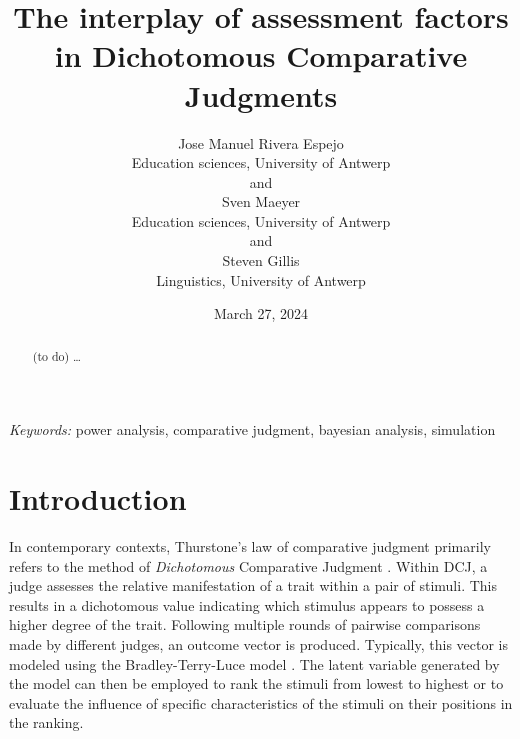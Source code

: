 \documentclass[
  12pt]{article}
\begin{document}
\def\spacingset#1{\renewcommand{\baselinestretch}%
{#1}\small\normalsize} \spacingset{1}



\date{March 27, 2024}
\title{\bf The interplay of assessment factors in Dichotomous
Comparative Judgments}
\author{
Jose Manuel Rivera Espejo\\
Education sciences, University of Antwerp\\
and\\Sven Maeyer\\
Education sciences, University of Antwerp\\
and\\Steven Gillis\\
Linguistics, University of Antwerp\\
}
\maketitle

\bigskip
\bigskip
\begin{abstract}
(to do) \ldots{}
\end{abstract}

\noindent%
{\it Keywords:} power analysis, comparative judgment, bayesian
analysis, simulation
\vfill

\newpage
\spacingset{1.9} %

\section{Introduction}\label{sec-introduction}

In contemporary contexts, Thurstone's law of comparative judgment
\citeyearpar{Thurstone_1927} primarily refers to the method of
\emph{Dichotomous} Comparative Judgment
\citep[DCJ,][]{Pollitt_2012a, Pollitt_2012b}. Within DCJ, a judge
assesses the relative manifestation of a trait within a pair of stimuli.
This results in a dichotomous value indicating which stimulus appears to
possess a higher degree of the trait. Following multiple rounds of
pairwise comparisons made by different judges, an outcome vector is
produced. Typically, this vector is modeled using the Bradley-Terry-Luce
model \citep[BTL
model,][]{Bradley_et_al_1952, Luce_1959, Pollitt_2012a}. The latent
variable generated by the model can then be employed to rank the stimuli
from lowest to highest or to evaluate the influence of specific
characteristics of the stimuli on their positions in the ranking.
\end{document}
